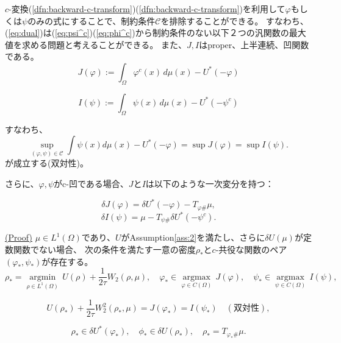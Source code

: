 $c$-変換(\ref{dfn:backward-c-transform})(\ref{dfn:backward-c-transform})を利用して$\varphi$もしくは$\psi$のみの式にすることで、制約条件$\mathcal{C}$を排除することができる。
すなわち、(\ref{eq:dual})は(\ref{eq:psi^c})(\ref{eq:phi^c})から制約条件のない以下２つの汎関数の最大値を求める問題と考えることができる。
また、$J,I$はproper、上半連続、凹関数である。
\begin{equation}
    \label{eq:J}
    J(\varphi):= \int_{\Omega} \varphi^c(x) \,d\mu(x) - U^*(- \varphi)
\end{equation}

\begin{equation}
    \label{eq:I}
    I(\psi):= \int_{\Omega} \psi(x) \, d\mu(x) - U^*(- \psi^{c})
\end{equation}

すなわち、
\[
\sup_{(\varphi,\psi) \in \mathcal{C}} \int \psi(x) d\mu(x) - U^*(- \varphi) = \sup J(\varphi) = \sup I(\psi).
\]
が成立する(双対性)。

さらに、$\varphi, \psi$がc-凹である場合、$J$と$I$は以下のような一次変分を持つ：

\begin{equation}
    \label{eq:delta J}
    \delta J(\varphi) = \delta U^*(- \varphi) - T_{\varphi \#} \mu,
\end{equation}
\begin{equation}
    \label{eq:delta I}
    \delta I(\psi) = \mu - T_{\psi \#} \delta U^* (- \psi^c).
\end{equation}

\begin{thm}
    \label{thm: duality}
    \hyperlink{proof:thm:duality}{(Proof)}
        $\mu \in L^1(\Omega)$であり、$U$がAssumption\ref{ass:2}を満たし、さらに$\delta U(\mu)$が定数関数でない場合、
        次の条件を満たす一意の密度$\rho_*$と$c$-共役な関数のペア$(\varphi_*, \psi_*)$が存在する。
    \begin{equation*}
        \rho_* = \underset{\rho \in L^1(\Omega)} {\operatorname{argmin}} \, U(\rho) + \frac{1}{2\tau} W_2(\rho, \mu), \quad \varphi_* \in \underset{\varphi \in C(\Omega)} {\operatorname{argmax}} \, J(\varphi), \quad \psi_* \in \underset{\psi \in C(\Omega)} {\operatorname{argmax}} \, I(\psi),
    \end{equation*}
    
    \begin{equation*}
    U(\rho_*) + \frac{1}{2\tau} W_2^2(\rho_*,\mu) = J(\varphi_*) = I(\psi_*) \quad (\text{双対性}), 
    \end{equation*}
    
    \begin{equation*}
        \rho_* \in \delta U^*(\varphi_*), \quad \phi_* \in \delta U(\rho_*), \quad \rho_* = T_{\varphi_* \#} \mu.
    \end{equation*}
    \end{thm}



